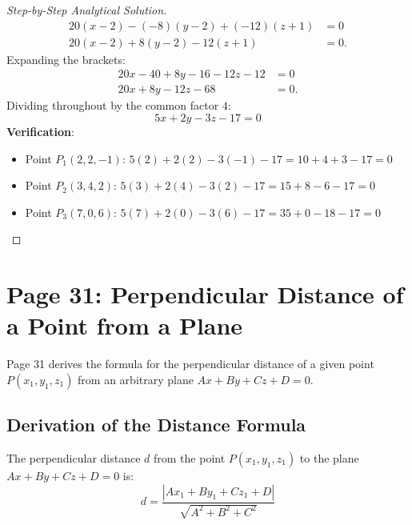 \begin{proof}[Step-by-Step Analytical Solution]
\begin{align}
    20(x - 2) - (-8)(y - 2) + (-12)(z + 1) &= 0 \nonumber\\
    20(x - 2) + 8(y - 2) - 12(z + 1) &= 0.
\end{align}
Expanding the brackets:
\begin{align}
    20x - 40 + 8y - 16 - 12z - 12 &= 0 \nonumber\\
    20x + 8y - 12z - 68 &= 0.
\end{align}
Dividing throughout by the common factor $4$:
\begin{equation}
    \boxed{5x + 2y - 3z - 17 = 0}
\end{equation}
\textbf{Verification}:
\begin{itemize}[noitemsep]
    \item Point $P_1(2, 2, -1)$: $5(2) + 2(2) - 3(-1) - 17 = 10 + 4 + 3 - 17 = 0$ \quad \checkmark
    \item Point $P_2(3, 4, 2)$: $5(3) + 2(4) - 3(2) - 17 = 15 + 8 - 6 - 17 = 0$ \quad \checkmark
    \item Point $P_3(7, 0, 6)$: $5(7) + 2(0) - 3(6) - 17 = 35 + 0 - 18 - 17 = 0$ \quad \checkmark
\end{itemize}
\end{proof}

\section{Page 31: Perpendicular Distance of a Point from a Plane}
\label{sec:page31}

\begin{conceptbox}
Page 31 derives the formula for the perpendicular distance of a given point $P(x_1, y_1, z_1)$ from an arbitrary plane $Ax + By + Cz + D = 0$.
\end{conceptbox}

\subsection{Derivation of the Distance Formula}
\begin{theorembox}
The perpendicular distance $d$ from the point $P(x_1, y_1, z_1)$ to the plane $Ax + By + Cz + D = 0$ is:
\begin{equation}
    \boxed{d = \frac{|Ax_1 + By_1 + Cz_1 + D|}{\sqrt{A^2 + B^2 + C^2}}}
\end{equation}
\end{theorembox}

